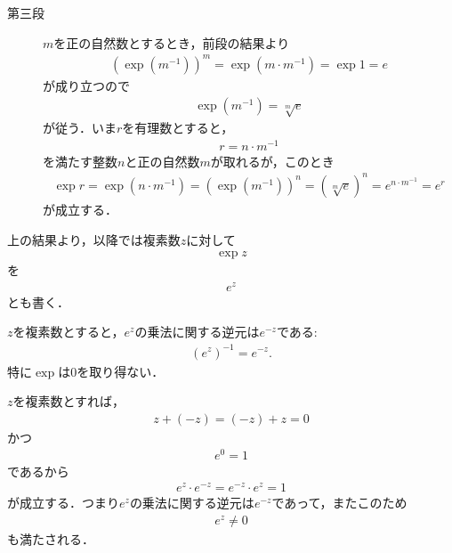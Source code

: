 \begin{sketch}
\begin{description}
			\item[第三段]
				$m$を正の自然数とするとき，前段の結果より
				\begin{align}
					(\exp{(m^{-1})})^{m} = \exp{(m \cdot m^{-1})} = \exp{1} = e
				\end{align}
				が成り立つので
				\begin{align}
					\exp{(m^{-1})} = \sqrt[m]{e}
				\end{align}
				が従う．いま$r$を有理数とすると，
				\begin{align}
					r = n \cdot m^{-1}
				\end{align}
				を満たす整数$n$と正の自然数$m$が取れるが，このとき
				\begin{align}
					\exp{r} = \exp{(n \cdot m^{-1})}
					= (\exp{(m^{-1})})^{n}
					= (\sqrt[m]{e})^{n}
					= e^{n \cdot m^{-1}}
					= e^r
				\end{align}
				が成立する．
				\QED
		\end{description}
	\end{sketch}
	
	上の結果より，以降では複素数$z$に対して
	\begin{align}
		\exp{z}
	\end{align}
	を
	\begin{align}
		e^{z}
	\end{align}
	とも書く．
	
	\begin{screen}
		\begin{thm}[$e$のマイナス乗は逆元]\label{thm:inversion_of_exp_z_is_exp_minus_z}
			$z$を複素数とすると，$e^z$の乗法に関する逆元は$e^{-z}$である:
			\begin{align}
				(e^z)^{-1} = e^{-z}.
			\end{align}
			特に$\exp$は$0$を取り得ない．
		\end{thm}
	\end{screen}
	
	\begin{sketch}
		$z$を複素数とすれば，
		\begin{align}
			z + (-z) = (-z) + z = 0
		\end{align}
		かつ
		\begin{align}
			e^0 = 1
		\end{align}
		であるから
		\begin{align}
			e^z \cdot e^{-z} = e^{-z} \cdot e^z = 1
		\end{align}
		が成立する．つまり$e^{z}$の乗法に関する逆元は$e^{-z}$であって，またこのため
		\begin{align}
			e^{z} \neq 0
		\end{align}
		も満たされる．
		\QED
	\end{sketch}
	
